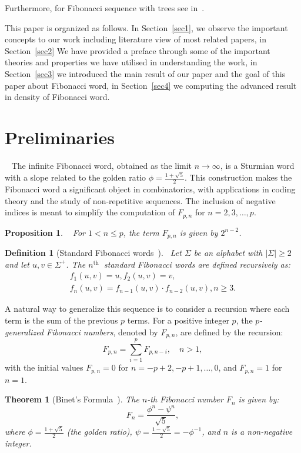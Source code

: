 \documentclass[12pt, a4paper]{article}
\newtheorem{theorem}{Theorem}[section]
\newtheorem{proposition}{Proposition}[section]
\newtheorem{definition}{Definition}
\begin{document}
Furthermore, for Fibonacci sequence with trees see in~\cite{ref02,R3,path7}. \par
This paper is organized as follows. In Section~\ref{sec1}, we observe the important concepts to our work including literature view of most related papers, in Section~\ref{sec2} We have provided a preface through some of the important theories and properties we have utilised in understanding the work, in Section~\ref{sec3} we introduced the main result of our paper and the goal of this paper about Fibonacci word, in Section~\ref{sec4} we computing the advanced result in density of Fibonacci word.


\section{Preliminaries}~\label{sec2}
The infinite Fibonacci word, obtained as the limit $n \to \infty$, is a Sturmian word with a slope related to the golden ratio $\phi = \frac{1 + \sqrt{5}}{2}$. This construction makes the Fibonacci word a significant object in combinatorics, with applications in coding theory and the study of non-repetitive sequences. The inclusion of negative indices is meant to simplify the computation of $F_{p,n}$ for $n=2,3,\dots,p$.
\begin{proposition}~\cite{PulidoRamírez}
For $1<n\leq p$, the term $F_{p,n}$ is given by $2^{n-2}$. 
\end{proposition}
\begin{definition}[Standard Fibonacci words~\cite{Kulkarni2021Mahalingam}]~\label{fibword01}
Let $\Sigma$ be an alphabet with $|\Sigma| \geq 2$ and let $u, v \in \Sigma^{+}$. The $n^{\text {th }}$ standard Fibonacci words are defined recursively as:
$$
\begin{gathered}
f_1(u, v)=u, f_2(u, v)=v, \\
f_n(u, v)=f_{n-1}(u, v) \cdot f_{n-2}(u, v), n \geq 3 .
\end{gathered}
$$
\end{definition}
A natural way to generalize this sequence is to consider a recursion where each term is the sum of the previous $p$ terms.   
For a positive integer $p$, the \emph{$p$-generalized Fibonacci numbers}, denoted by $F_{p,n}$, are  defined by the recursion:
    \[ F_{p,n}=    
        \sum_{i=1}^{p}F_{p,n-i}, \quad  n>1,
     \]
with the initial values $F_{p,n}=0$ for  $n=-p+2,-p+1,\dots, 0$, and $F_{p,n}=1$ for $n=1$. 
\begin{theorem}[Binet's Formula~\cite{knuth1997}]
The $n$-th Fibonacci number $F_n$ is given by:
\[
F_n = \frac{\phi^n - \psi^n}{\sqrt{5}},
\]
where $\phi = \frac{1 + \sqrt{5}}{2}$ (the golden ratio), $\psi = \frac{1 - \sqrt{5}}{2} = -\phi^{-1}$, and $n$ is a non-negative integer.
\end{theorem}
\end{document}
